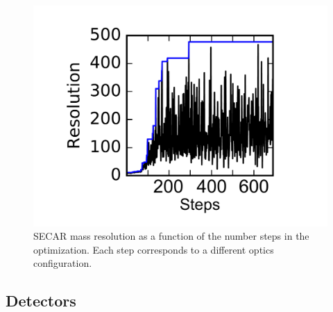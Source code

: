 \documentclass[%
10pt]{article}
\begin{document}
\begin{figure}
\centering
\includegraphics[width=0.55\linewidth]{figures/SECAR_optimization.pdf}
\caption{SECAR mass resolution as a function of the number steps in the optimization. Each step corresponds to a different optics configuration.}
\end{figure}

\clearpage
\newpage




\subsection{Detectors}
\end{document}

